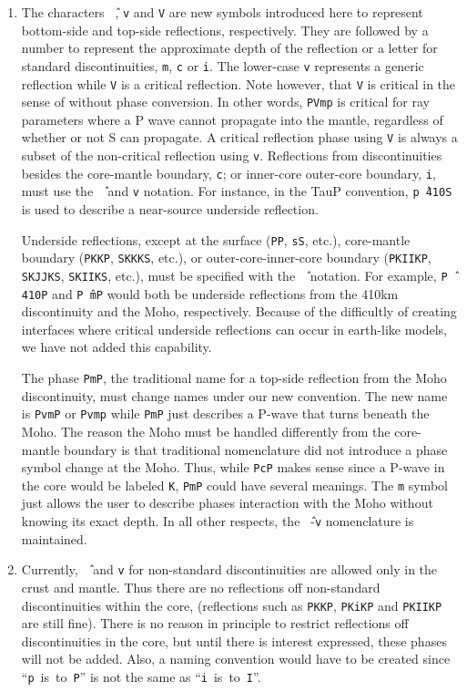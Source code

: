 \begin{enumerate}
\item \label{carrotv}
The characters \texttt{\^\,}, \texttt{v} and \texttt{V} are new symbols introduced here to
represent bottom-side and top-side reflections, respectively.
They are followed by a number to
represent the approximate depth of the reflection or
a letter for standard discontinuities, \texttt{m}, \texttt{c} or \texttt{i}.
The lower-case \texttt{v} represents a generic reflection while \texttt{V} is
a critical reflection. Note however, that  \texttt{V} is critical in the sense of
without phase conversion. In other words, \texttt{PVmp} is critical for ray parameters
where a P wave cannot propagate into the mantle, regardless of whether
or not S can propagate. A critical reflection phase using \texttt{V} is always
a subset of the non-critical reflection using \texttt{v}.
Reflections from discontinuities besides the
core-mantle boundary, \texttt{c};
or inner-core outer-core boundary, \texttt{i}, must use the \texttt{\^\,}
and \texttt{v} notation.
For instance, in the TauP convention, \texttt{p\^\,410S} is used to describe
a near-source underside reflection.

Underside reflections, except at the
surface (\texttt{PP}, \texttt{sS}, etc.),
core-mantle boundary (\texttt{PKKP}, \texttt{SKKKS}, etc.), or
outer-core-inner-core boundary (\texttt{PKIIKP}, \texttt{SKJJKS},
\texttt{SKIIKS}, etc.), must
be specified with the \texttt{\^\,} notation.
For example, \texttt{P\^\,410P} and
\texttt{P\^\,mP} would both be underside
reflections from the 410km discontinuity and the Moho, respectively.
Because of the difficultly of creating interfaces where critical underside reflections
can occur in earth-like models, we have not added this capability.

The phase \texttt{PmP}, the traditional name for a top-side reflection from the Moho
discontinuity, must change names under our new convention.
The new name is \texttt{PvmP} or \texttt{Pvmp}
while \texttt{PmP} just describes a P-wave that turns beneath the Moho.
The reason the Moho must be handled differently from the core-mantle boundary is that
traditional nomenclature did not introduce a phase symbol change at the Moho.
Thus, while \texttt{PcP} makes sense since a P-wave in the core would be labeled
\texttt{K}, \texttt{PmP} could have several meanings.
The \texttt{m} symbol just allows the user to describe phases interaction with the Moho
without knowing its exact depth.
In all other respects, the \texttt{\^\,}-\texttt{v} nomenclature is maintained.

\item
Currently, \texttt{\^\,} and \texttt{v} for non-standard
discontinuities are allowed only in
the crust and mantle. Thus there are no reflections off non-standard
discontinuities within the core, (reflections such as \texttt{PKKP},
\texttt{PKiKP} and \texttt{PKIIKP} are
still fine).
There is no
reason in principle to restrict reflections off discontinuities in the
core, but until there is interest expressed, these phases will not be added.
Also, a naming convention would have to be created since
``\texttt{p}~is~to~\texttt{P}'' is not the same as
``\texttt{i}~is~to~\texttt{I}''.


\end{enumerate}
